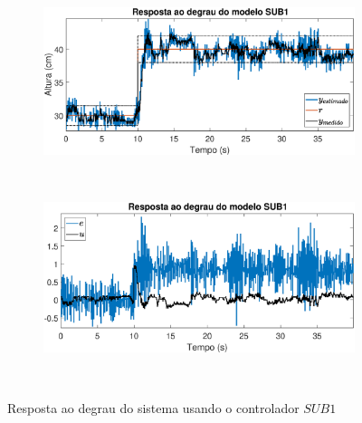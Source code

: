 \begin{figure}[htb]
	\centering
	\begin{subfigure}[t]{0.47\textwidth}
		\includegraphics[width=1\linewidth]{steprsub1y}
		\label{fig:steprsub1y}
	\end{subfigure}
	~ %
	~
	\begin{subfigure}[t]{0.47\textwidth}
		\includegraphics[width=1\linewidth]{steprsub1e}
		\label{fig:steprsub1e}
	\end{subfigure}
	~ %
	
	\caption{Resposta ao degrau do sistema usando o controlador $SUB1$}\label{fig:steprsub1}
\end{figure}


